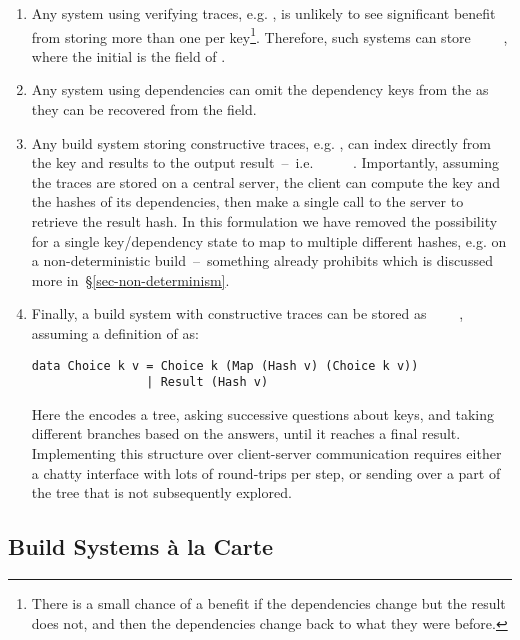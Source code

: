 \begin{enumerate}
\item Any system using verifying traces, e.g. \Shake, is unlikely to see significant benefit from storing more than one  per key\footnote{There is a small chance of a benefit if the dependencies change but the result does not, and then the dependencies change back to what they were before.}. Therefore, such systems can store ~~~~, where the initial  is the  field of .
\item Any system using  dependencies can omit the dependency keys from the  as they can be recovered from the  field.
\item Any  build system storing constructive traces, e.g. \Bazel, can index directly from the key and results to the output result~--~i.e. ~~\hs{[Hash}~\hs{v])}~~. Importantly, assuming the traces are stored on a central server, the client can compute the key and the hashes of its dependencies, then make a single call to the server to retrieve the result hash. In this formulation we have removed the possibility for a single key/dependency state to map to multiple different hashes, e.g. on a non-deterministic build~--~something \Bazel already prohibits which is discussed more in~\S\ref{sec-non-determinism}.
\item Finally, a  build system with constructive traces can be stored as ~~~~, assuming a definition of  as:
\begin{verbatim}
data Choice k v = Choice k (Map (Hash v) (Choice k v))
                | Result (Hash v)
\end{verbatim}
Here the  encodes a tree, asking successive questions about keys, and taking different branches based on the answers, until it reaches a final result. Implementing this structure over client-server communication requires either a chatty interface with lots of round-trips per  step, or sending over a part of the tree that is not subsequently explored.
\end{enumerate}

\subsection{Build Systems \`a la Carte}\label{sec-design-space}

